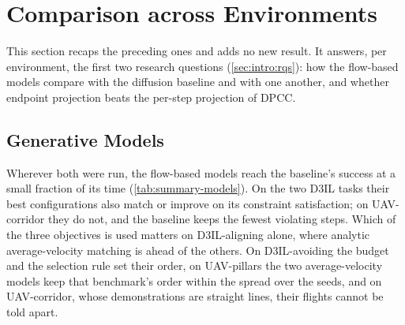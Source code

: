 
\section{Comparison across Environments}\label{sec:res:summary}

This section recaps the preceding ones and adds no new result. It answers, per environment, the first two
research questions (\autoref{sec:intro:rqs}): how the flow-based models compare with the diffusion baseline
and with one another, and whether endpoint projection beats the per-step projection of \ac{DPCC}.

\subsection{Generative Models}\label{sec:res:summary:models}

Wherever both were run, the flow-based models reach the baseline's success at a small fraction of its time
(\autoref{tab:summary-models}). On the two D3IL tasks their best configurations also match or improve on its
constraint satisfaction; on UAV-corridor they do not, and the baseline keeps the fewest violating steps.
Which of the three objectives is used matters on D3IL-aligning alone, where analytic average-velocity
matching is ahead of the others. On D3IL-avoiding the budget and the selection rule set their order, on
UAV-pillars the two average-velocity models keep that benchmark's order within the spread over the seeds,
and on UAV-corridor, whose demonstrations are straight lines, their flights cannot be told apart.

